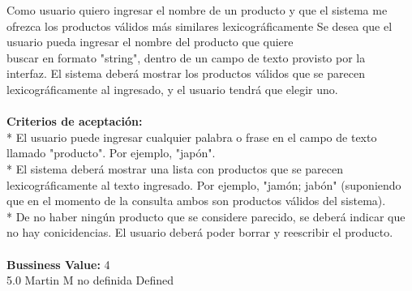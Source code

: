 	{Como usuario quiero ingresar el nombre de un producto y que el sistema me ofrezca los productos válidos más similares lexicográficamente} %
	{Se desea que el usuario pueda ingresar el nombre del producto que quiere\\
buscar en formato "string", dentro de un campo de texto provisto por la\\
interfaz. El sistema deberá mostrar los productos válidos que se parecen\\
lexicográficamente al ingresado, y el usuario tendrá que elegir uno.\\
  \\
\textbf{Criterios de aceptación:}\\
* El usuario puede ingresar cualquier palabra o frase en el campo de texto llamado "producto". Por ejemplo, "japón".  \\
* El sistema deberá mostrar una lista con productos que se parecen lexicográficamente al texto ingresado. Por ejemplo, "jamón; jabón" (suponiendo que en el momento de la consulta ambos son productos válidos del sistema).  \\
* De no haber ningún producto que se considere parecido, se deberá indicar que no hay conicidencias. El usuario deberá poder borrar y reescribir el producto. \\
  \\
\textbf{Bussiness Value:} 4\\
} %
	{} %
	{5.0} %
	{Martin M} %
	{no definida} %
	{Defined} %


\vspace{20pt}

